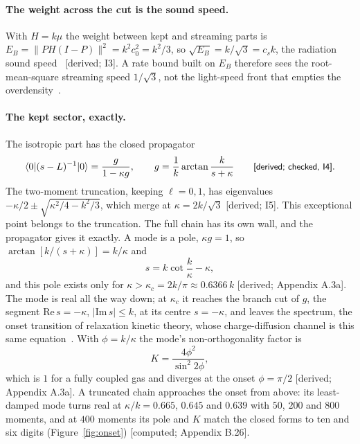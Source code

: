 \documentclass[11pt]{article}
\newcommand{\grade}[1]{\textsf{\small[#1]}}
\begin{document}
\paragraph{The weight across the cut is the sound speed.} With $H=k\mu$ the weight between kept and streaming parts is $E_B=\lVert PH(I-P)\rVert^2=k^2c_0^2=k^2/3$, so $\sqrt{E_B}=k/\sqrt3=c_s k$, the radiation sound speed~\cite{WB} \grade{derived; I3}. A rate bound built on $E_B$ therefore sees the root-mean-square streaming speed $1/\sqrt3$, not the light-speed front that empties the overdensity~\cite{OSL}.

\paragraph{The kept sector, exactly.} The isotropic part has the closed propagator
\begin{equation}
\langle0|(s-L)^{-1}|0\rangle=\frac{g}{1-\kappa g},\qquad g=\frac1k\arctan\frac{k}{s+\kappa}\qquad\text{\grade{derived; checked, I4}}.
\end{equation}
The two-moment truncation, keeping $\ell=0,1$, has eigenvalues $-\kappa/2\pm\sqrt{\kappa^2/4-k^2/3}$, which merge at $\kappa=2k/\sqrt3$ \grade{derived; I5}. This exceptional point belongs to the truncation. The full chain has its own wall, and the propagator gives it exactly. A mode is a pole, $\kappa g=1$, so $\arctan[k/(s+\kappa)]=k/\kappa$ and
\begin{equation}
s=k\cot\frac{k}{\kappa}-\kappa,
\end{equation}
and this pole exists only for $\kappa>\kappa_c=2k/\pi\approx0.6366\,k$ \grade{derived; Appendix A.3a}. The mode is real all the way down; at $\kappa_c$ it reaches the branch cut of $g$, the segment $\mathrm{Re}\,s=-\kappa$, $|\mathrm{Im}\,s|\le k$, at its centre $s=-\kappa$, and leaves the spectrum, the onset transition of relaxation kinetic theory, whose charge-diffusion channel is this same equation~\cite{Rom,Hu}. With $\phi=k/\kappa$ the mode's non-orthogonality factor is
\begin{equation}
K=\frac{4\phi^2}{\sin^2 2\phi},
\end{equation}
which is $1$ for a fully coupled gas and diverges at the onset $\phi=\pi/2$ \grade{derived; Appendix A.3a}. A truncated chain approaches the onset from above: its least-damped mode turns real at $\kappa/k=0.665$, $0.645$ and $0.639$ with $50$, $200$ and $800$ moments, and at $400$ moments its pole and $K$ match the closed forms to ten and six digits (Figure~\ref{fig:onset}) \grade{computed; Appendix B.26}.
\end{document}
